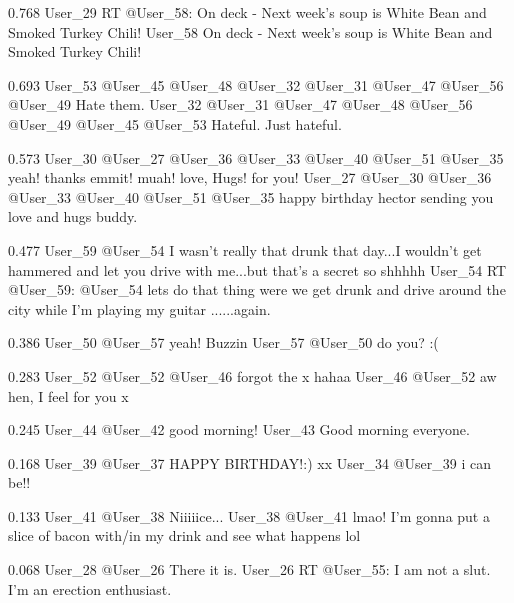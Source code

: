 {0.768}
{\joinNameTweet
{User\_29}
{RT @User\_58: On deck - Next week's soup is White Bean and Smoked Turkey Chili!}}
{\joinNameTweet
{User\_58}
{On deck - Next week's soup is White Bean and Smoked Turkey Chili!}}

{0.693}
{\joinNameTweet
{User\_53}
{@User\_45 @User\_48 @User\_32 @User\_31 @User\_47 @User\_56 @User\_49 Hate them.}}
{\joinNameTweet
{User\_32}
{@User\_31 @User\_47 @User\_48 @User\_56 @User\_49 @User\_45 @User\_53 Hateful. Just hateful.}}

{0.573}
{\joinNameTweet
{User\_30}
{@User\_27 @User\_36 @User\_33 @User\_40 @User\_51 @User\_35 yeah! thanks emmit! muah! love, Hugs! for you!}}
{\joinNameTweet
{User\_27}
{@User\_30 @User\_36 @User\_33 @User\_40 @User\_51 @User\_35 happy birthday hector sending you love and hugs buddy.}}

{0.477}
{\joinNameTweet
{User\_59}
{@User\_54 I wasn't really that drunk that day...I wouldn't get hammered and let you drive with me...but that's a secret so shhhhh}}
{\joinNameTweet
{User\_54}
{RT @User\_59: @User\_54 lets do that thing were we get drunk and drive around the city while I'm playing my guitar ......again.}}

{0.386}
{\joinNameTweet
{User\_50}
{@User\_57 yeah! Buzzin}}
{\joinNameTweet
{User\_57}
{@User\_50 do you? :(}}

{0.283}
{\joinNameTweet
{User\_52}
{@User\_52 @User\_46 forgot the x hahaa}}
{\joinNameTweet
{User\_46}
{@User\_52 aw hen, I feel for you x}}

{0.245}
{\joinNameTweet
{User\_44}
{@User\_42 good morning!}}
{\joinNameTweet
{User\_43}
{Good morning everyone.}}

{0.168}
{\joinNameTweet
{User\_39}
{@User\_37 HAPPY BIRTHDAY!:) xx}}
{\joinNameTweet
{User\_34}
{@User\_39 i can be!!}}

{0.133}
{\joinNameTweet
{User\_41}
{@User\_38 Niiiiice...}}
{\joinNameTweet
{User\_38}
{@User\_41 lmao! I'm gonna put a slice of bacon with/in my drink and see what happens lol}}

{0.068}
{\joinNameTweet
{User\_28}
{@User\_26 There it is.}}
{\joinNameTweet
{User\_26}
{RT @User\_55: I am not a slut.    I'm an erection enthusiast.}}
